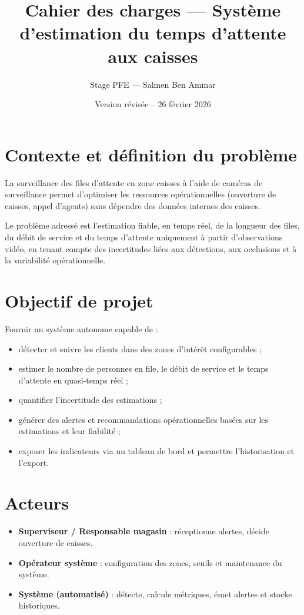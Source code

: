 \documentclass[11pt,a4paper]{article}
\title{Cahier des charges — Système d'estimation du temps d'attente aux caisses}
\author{Stage PFE — Salmen Ben Ammar}
\date{Version révisée -- 26 février 2026}
\begin{document}
\maketitle
\vspace{5mm}

\section{Contexte et définition du problème}
La surveillance des files d'attente en zone caisses à l'aide de caméras de surveillance permet d'optimiser les ressources opérationnelles (ouverture de caisses, appel d'agents) sans dépendre des données internes des caisses.

Le problème adressé est l'estimation fiable, en temps réel, de la longueur des files, du débit de service et du temps d'attente uniquement à partir d'observations vidéo, en tenant compte des incertitudes liées aux détections, aux occlusions et à la variabilité opérationnelle.

\section{Objectif de projet}
Fournir un système autonome capable de :
\begin{itemize}
  \item détecter et suivre les clients dans des zones d'intérêt configurables ;
  \item estimer le nombre de personnes en file, le débit de service et le temps d'attente en quasi‑temps réel ;
  \item quantifier l'incertitude des estimations ;
  \item générer des alertes et recommandations opérationnelles basées sur les estimations et leur fiabilité ;
  \item exposer les indicateurs via un tableau de bord et permettre l'historisation et l'export.
\end{itemize}

\section{Acteurs}
\begin{itemize}
  \item \textbf{Superviseur / Responsable magasin} : réceptionne alertes, décide ouverture de caisses.
  \item \textbf{Opérateur système} : configuration des zones, seuils et maintenance du système.
  \item \textbf{Système (automatisé)} : détecte, calcule métriques, émet alertes et stocke historiques.
\end{itemize}
\end{document}
